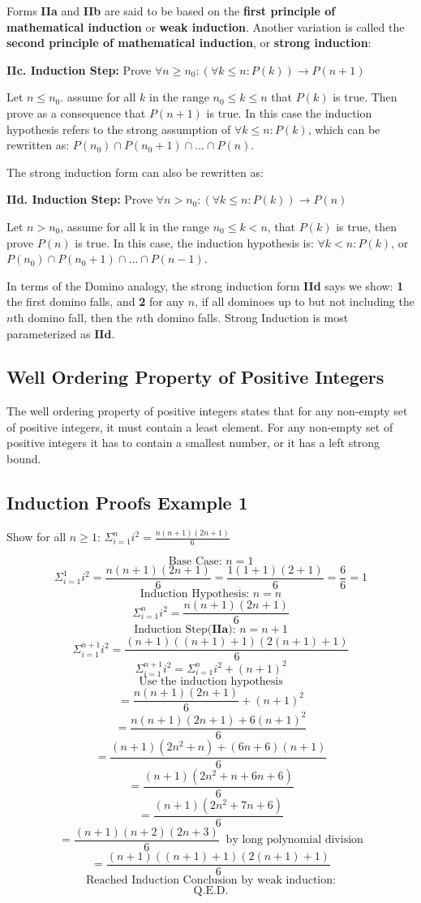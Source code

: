 \documentclass{article}
\begin{document}
Forms \textbf{IIa} and \textbf{IIb} are said to be based on the \textbf{first principle of mathematical induction} or \textbf{weak induction}. Another variation is called the \textbf{second principle of mathematical induction}, or \textbf{strong induction}:

\textbf{IIc.    Induction Step: } Prove $\forall n \ge n_0 : (\forall k \le n: P(k)) \rightarrow P(n + 1)$

Let $n \le n_0$. assume for all $k$ in the range $n_0 \le k \le n$ that $P(k)$ is true. Then prove as a consequence that $P(n + 1)$ is true. In this case the induction hypothesis refers to the strong assumption of $\forall k \le n : P(k)$, which can be rewritten as: $P(n_0) \cap P(n_0 + 1) \cap \dots \cap P(n)$.

The strong induction form can also be rewritten as:

\textbf{IId.    Induction Step: } Prove $\forall n > n_0 : (\forall k \le n: P(k)) \rightarrow P(n)$

Let $n > n_0$, assume for all k in the range $n_0 \le k < n$, that $P(k)$ is true, then prove $P(n)$ is true. In this case, the induction hypothesis is: $\forall k < n : P(k)$, or $P(n_0) \cap P(n_0 + 1) \cap \dots \cap P(n -1)$.

In terms of the Domino analogy, the strong induction form \textbf{IId} says we show: \textbf{1} the first domino falls, and \textbf{2} for any $n$, if all dominoes up to but not including the $n$th domino fall, then the $n$th domino falls. Strong Induction is most parameterized as $\textbf{IId}$.

\subsection{Well Ordering Property of Positive Integers}
The well ordering property of positive integers states that for any non-empty set of positive integers, it must contain a least element. For any non-empty set of positive integers it has to contain a smallest number, or it has a left strong bound. 

\subsection{Induction Proofs Example 1}
Show for all $n \ge 1$: $\Sigma_{i=1}^{n} i^2 = \frac{n(n+1)(2n+1)}{6}$

$$\text{Base Case: } n = 1$$
$$\Sigma_{i=1}^{1} i^2 = \frac{n(n+1)(2n+1)}{6} = \frac{1(1+1)(2+1)}{6} = \frac{6}{6} = 1$$
$$\text{Induction Hypothesis: } n = n$$
$$\Sigma_{i=1}^{n} i^2 = \frac{n(n+1)(2n+1)}{6}$$
$$\text{Induction Step(} \textbf{IIa} \text{): } n = n + 1$$
$$\Sigma_{i=1}^{n+1} i^2 = \frac{(n+1)((n+1)+1)(2(n+1)+1)}{6}$$
$$\Sigma_{i=1}^{n+1} i^2 =  \Sigma_{i=1}^{n} i^2 + (n+1)^2$$
$$\text{Use the induction hypothesis}$$
$$= \frac{n(n+1)(2n+1)}{6} + (n+1)^2$$
$$= \frac{n(n+1)(2n+1) + 6(n+1)^2}{6}$$
$$= \frac{(n+1)(2n^2 + n) + (6n+6)(n+1)}{6}$$
$$= \frac{(n+1)(2n^2 + n + 6n + 6)}{6}$$
$$= \frac{(n+1)(2n^2 + 7n + 6)}{6}$$
$$= \frac{(n+1)(n+2)(2n+3)}{6} \;\;\text{by long polynomial division}$$
$$= \frac{(n+1)((n+1) + 1)(2(n+1) + 1)}{6}$$
$$\text{Reached Induction Conclusion by weak induction:}$$
$$\text{Q.E.D.}$$
\end{document}
